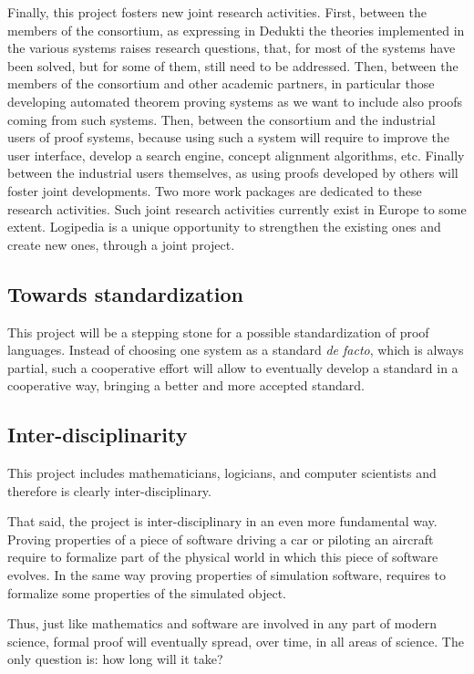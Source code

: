 Finally, this project fosters new joint research activities. First,
between the members of the consortium, as expressing in {\sf Dedukti}
the theories implemented in the various systems raises research
questions, that, for most of the systems have been solved, but for
some of them, still need to be addressed.  Then, between the members
of the consortium and other academic partners, in particular those
developing automated theorem proving systems as we want to include
also proofs coming from such systems. Then, between the consortium and
the industrial users of proof systems, because using such a system
will require to improve the user interface, develop a search engine,
concept alignment algorithms, etc.  Finally between the industrial
users themselves, as using proofs developed by others will foster
joint developments. Two more work packages are dedicated to these
research activities.
Such joint research activities currently exist in Europe to some
extent. {\sf Logipedia} is a unique opportunity to strengthen the
existing ones and create new ones, through a joint project.

\subsection{Towards standardization}

This project will be a stepping stone for a possible standardization
of proof languages. Instead of choosing one system as a standard {\em
de facto}, which is always partial, such a cooperative effort will
allow to eventually develop a standard in a cooperative way, bringing
a better and more accepted standard.

\subsection{Inter-disciplinarity}
This project includes mathematicians, logicians, and computer
scientists and therefore is clearly inter-disciplinary.

That said, the project is inter-disciplinary in an even more fundamental
way. Proving properties of a piece of software driving a car or
piloting an aircraft require to formalize part of the physical world
in which this piece of software evolves. In the same way proving
properties of simulation software, requires to formalize some
properties of the simulated object.

Thus, just like mathematics and software are involved in any part of
modern science, formal proof will eventually spread, over time, in all
areas of science. The only question is: how long will it take?

